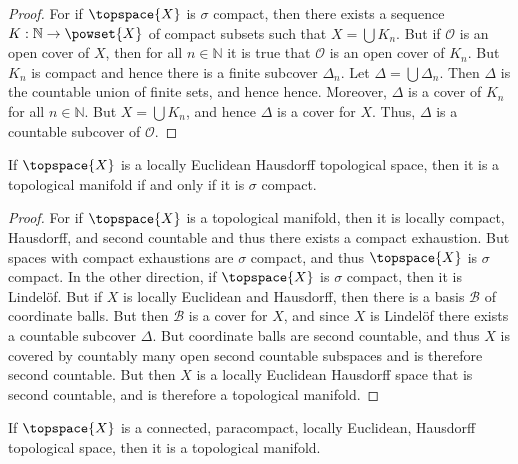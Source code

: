 \documentclass{article}                                                        %
\begin{document}
            \begin{proof}
                For if $\topspace{X}$ is $\sigma$ compact, then there exists a
                sequence $K:\mathbb{N}\rightarrow\powset{X}$ of compact subsets
                such that $X=\bigcup{K}_{n}$. But if $\mathcal{O}$ is an open
                cover of $X$, then for all $n\in\mathbb{N}$ it is true that
                $\mathcal{O}$ is an open cover of $K_{n}$. But $K_{n}$ is
                compact and hence there is a finite subcover $\Delta_{n}$. Let
                $\Delta=\bigcup\Delta_{n}$. Then $\Delta$ is the countable
                union of finite sets, and hence hence. Moreover, $\Delta$ is
                a cover of $K_{n}$ for all $n\in\mathbb{N}$. But
                $X=\bigcup{K}_{n}$, and hence $\Delta$ is a cover for $X$. Thus,
                $\Delta$ is a countable subcover of $\mathcal{O}$.
            \end{proof}
            \begin{theorem}
                If $\topspace{X}$ is a locally Euclidean Hausdorff topological
                space, then it is a topological manifold if and only if it is
                $\sigma$ compact.
            \end{theorem}
            \begin{proof}
                For if $\topspace{X}$ is a topological manifold, then it is
                locally compact, Hausdorff, and second countable and thus there
                exists a compact exhaustion. But spaces with compact exhaustions
                are $\sigma$ compact, and thus $\topspace{X}$ is $\sigma$
                compact. In the other direction, if $\topspace{X}$ is $\sigma$
                compact, then it is Lindel\"{o}f. But if $X$ is locally
                Euclidean and Hausdorff, then there is a basis $\mathcal{B}$
                of coordinate balls. But then $\mathcal{B}$ is a cover for $X$,
                and since $X$ is Lindel\"{o}f there exists a countable
                subcover $\Delta$. But coordinate balls are second countable,
                and thus $X$ is covered by countably many open second countable
                subspaces and is therefore second countable. But then $X$ is a
                locally Euclidean Hausdorff space that is second countable, and
                is therefore a topological manifold.
            \end{proof}
            \begin{theorem}
                If $\topspace{X}$ is a connected, paracompact, locally
                Euclidean, Hausdorff topological space, then it is a
                topological manifold.
            \end{theorem}
\end{document}
